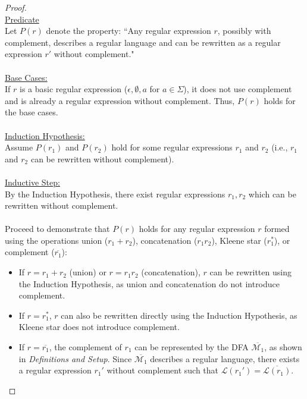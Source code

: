 \documentclass[12pt]{article}
\begin{document}
\begin{proof}
        \\
        \underline{Predicate} \\
        Let \( P(r) \) denote the property: ``Any regular expression \( r \), possibly with complement, describes a regular language and can be rewritten as a regular expression \( r' \) without complement." \\
        \\
        \underline{Base Cases:} \\
        If \( r \) is a basic regular expression (\( \epsilon, \emptyset, a \) for \( a \in \Sigma \)), it does not use complement and is already a regular expression without complement. Thus, \( P(r) \) holds for the base cases. \\
        \\
        \underline{Induction Hypothesis:} \\
        Assume \( P(r_1) \) and \( P(r_2) \) hold for some regular expressions \( r_1 \) and \( r_2 \) (i.e., \( r_1 \) and \( r_2 \) can be rewritten without complement). \\
        \\
        \underline{Inductive Step:} \\
        By the Induction Hypothesis, there exist regular expressions $r_1, r_2$ which can be rewritten without complement. \\
        \\
        Proceed to demonstrate that \( P(r) \) holds for any regular expression \( r \) formed using the operations union (\( r_1 + r_2 \)), concatenation (\( r_1r_2 \)), Kleene star (\( r_1^* \)), or complement (\( \overline{r_1} \)):
        \begin{itemize}
            \item If \( r = r_1 + r_2 \) (union) or \( r = r_1r_2 \) (concatenation), \( r \) can be rewritten using the Induction Hypothesis, as union and concatenation do not introduce complement.
            \item If \( r = r_1^* \), \( r \) can also be rewritten directly using the Induction Hypothesis, as Kleene star does not introduce complement.
            \item If \( r = \overline{r_1} \), the complement of \( r_1 \) can be represented by the DFA \( \overline{\mathcal{M}_1} \), as shown in \textit{Definitions and Setup}. Since \( \overline{\mathcal{M}_1} \) describes a regular language, there exists a regular expression \( r_1' \) without complement such that \( \mathcal{L}(r_1') = \overline{\mathcal{L}(r_1)} \).

\end{itemize}
\end{proof}
\end{document}
